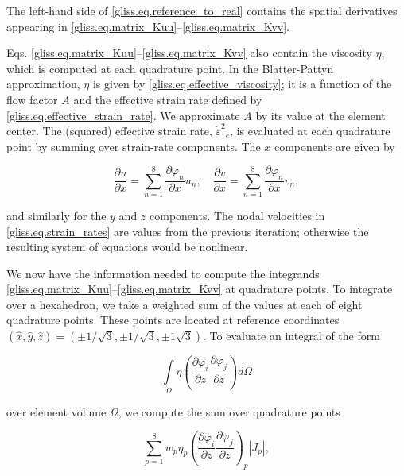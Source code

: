 \noindent
The left-hand side of \eqref{gliss.eq.reference_to_real} contains the spatial derivatives 
appearing in \eqref{gliss.eq.matrix_Kuu}--\eqref{gliss.eq.matrix_Kvv}.

Eqs. \eqref{gliss.eq.matrix_Kuu}--\eqref{gliss.eq.matrix_Kvv} also contain the viscosity $\eta$,
which is computed at each quadrature point.
In the Blatter-Pattyn approximation, $\eta$ is given by \eqref{gliss.eq.effective_viscosity};
it is a function of the flow factor $A$ and the effective strain rate defined by \eqref{gliss.eq.effective_strain_rate}.
We approximate $A$ by its value at the element center.
The (squared) effective strain rate, ${{\dot{\varepsilon }}^{2}}_{e}$, is evaluated at each quadrature point
by summing over strain-rate components.  The $x$ components are given by

\begin{equation}
  \label{gliss.eq.strain_rates}
  \frac{\partial u}{\partial x}=\sum\limits_{n=1}^{8}{\frac{\partial {{\varphi }_{n}}}{\partial x}}{{u}_{n}}, \quad
  \frac{\partial v}{\partial x}=\sum\limits_{n=1}^{8}{\frac{\partial {{\varphi }_{n}}}{\partial x}}{{v}_{n}},
\end{equation}

\noindent
and similarly for the $y$ and $z$ components.  The nodal velocities in \eqref{gliss.eq.strain_rates}
are values from the previous iteration; otherwise the resulting system of equations would be nonlinear.

We now have the information needed to compute the integrands \eqref{gliss.eq.matrix_Kuu}--\eqref{gliss.eq.matrix_Kvv}
at quadrature points. To integrate over a hexahedron, we take a weighted sum of the values at each
of eight quadrature points.  These points are located at
reference coordinates $(\hat{x},\hat{y},\hat{z}) = (\pm 1/\sqrt{3}, \pm 1/\sqrt{3}, \pm 1\sqrt{3})$.
To evaluate an integral of the form

\begin{equation}
  \int\limits_{\Omega }{\eta \left( \frac{\partial {{\varphi }_{i}}}{\partial z}\frac{\partial {{\varphi }_{j}}}{\partial z} \right)}d\Omega
\end{equation}

\noindent
over element volume $\Omega$, we compute the sum over quadrature points

\begin{equation}
  \label{gliss.eq.sum_over_qp}
  \sum\limits_{p=1}^{8}{{{w}_{p}}{{\eta }_{p}}{{\left( \frac{\partial {{\varphi }_{i}}}{\partial z}\frac{\partial {{\varphi }_{j}}}{\partial z} \right)}_{p}}}|J_p|,
\end{equation}

